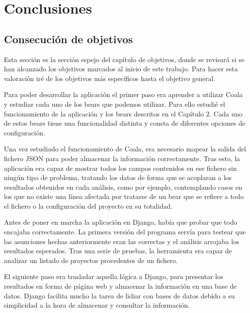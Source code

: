 \documentclass[a4paper, 12pt]{book}
\begin{document}

\cleardoublepage
\chapter{Conclusiones}
\label{chap:conclusiones}


\section{Consecución de objetivos}
\label{sec:consecucion-objetivos}

Esta sección es la sección espejo del capítulo de objetivos, donde se revisará si se han alcanzado los objetivos marcados al inicio de este trabajo. Para hacer esta valoración iré de los objetivos más específicos hasta el objetivo general.

Para poder desarrollar la aplicación el primer paso era aprender a utilizar Coala y estudiar cada uno de los bears que podemos utilizar. Para ello estudié el funcionamiento de la aplicación y los bears descritos en el Capítulo 2. Cada uno de estos bears tiene una funcionalidad distinta y consta de diferentes opciones de configuración.

Una vez estudiado el funcionamiento de Coala, era necesario mapear la salida del fichero JSON para poder almacenar la información correctamente. Tras esto, la aplicación era capaz de mostrar todos los campos contenidos en ese fichero sin ningún tipo de problema, tratando los datos de forma que se acoplaran a los resultados obtenidos en cada análisis, como por ejemplo, contemplando casos en los que no existe una línea afectada por tratarse de un bear que se refiere a todo el fichero o la configuración del proyecto en su totalidad.

Antes de poner en marcha la aplicación en Django, había que probar que todo encajaba correctamente. La primera versión del programa servía para testear que las asunciones hechas anteriormente eran las correctas y el análisis arrojaba los resultados esperados. Tras una serie de pruebas, la herramienta era capaz de analizar un listado de proyectos procedentes de un fichero.

El siguiente paso era trasladar aquella lógica a Django, para presentar los resultados en forma de página web y almacenar la información en una base de datos. Django facilita mucho la tarea de lidiar con bases de datos debido a su simplicidad a la hora de almacenar y consultar la información.
\end{document}
